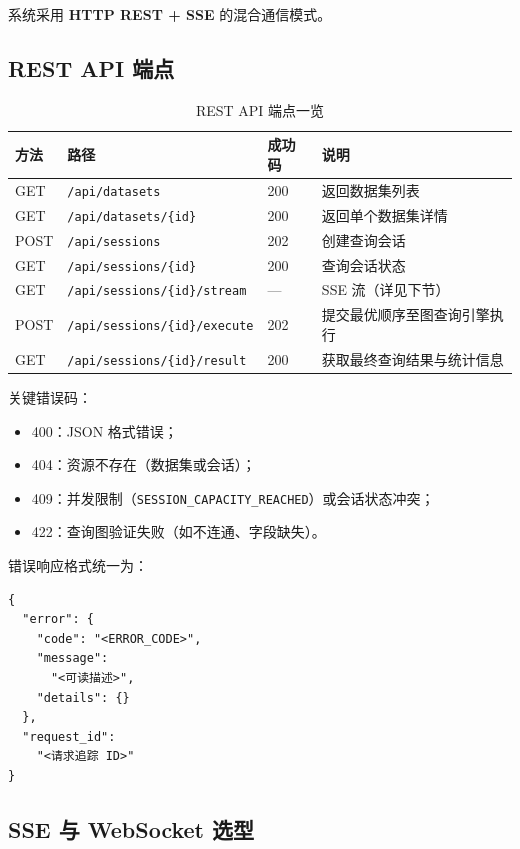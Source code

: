 \documentclass[12pt,a4paper]{article}
\begin{document}
系统采用 \textbf{HTTP REST + SSE} 的混合通信模式。

\subsection{REST API 端点}

\begin{table}[H]
\centering
\caption{REST API 端点一览}
\label{tab:api}
\begin{tabular}{lllp{5cm}}
\toprule
\textbf{方法} & \textbf{路径} & \textbf{成功码} & \textbf{说明} \\
\midrule
GET  & \texttt{/api/datasets}           & 200 & 返回数据集列表 \\
GET  & \texttt{/api/datasets/\{id\}}    & 200 & 返回单个数据集详情 \\
POST & \texttt{/api/sessions}           & 202 & 创建查询会话 \\
GET  & \texttt{/api/sessions/\{id\}}    & 200 & 查询会话状态 \\
GET  & \texttt{/api/sessions/\{id\}/stream} & --- & SSE 流（详见下节）\\
POST & \texttt{/api/sessions/\{id\}/execute} & 202 & 提交最优顺序至图查询引擎执行 \\
GET  & \texttt{/api/sessions/\{id\}/result}  & 200 & 获取最终查询结果与统计信息 \\
\bottomrule
\end{tabular}
\end{table}

关键错误码：
\begin{itemize}
  \item 400：JSON 格式错误；
  \item 404：资源不存在（数据集或会话）；
  \item 409：并发限制（\texttt{SESSION\_CAPACITY\_REACHED}）或会话状态冲突；
  \item 422：查询图验证失败（如不连通、字段缺失）。
\end{itemize}

错误响应格式统一为：
\begin{lstlisting}
{
  "error": {
    "code": "<ERROR_CODE>",
    "message": 
      "<可读描述>",
    "details": {}
  },
  "request_id": 
    "<请求追踪 ID>"
}
\end{lstlisting}

\subsection{SSE 与 WebSocket 选型}
\end{document}
